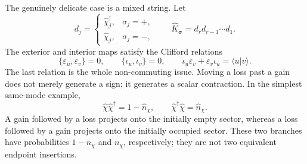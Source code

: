 \documentclass[aps,prb,onecolumn,nofootinbib,superscriptaddress]{revtex4-2}
\theoremstyle{plain}
\theoremstyle{definition}
\begin{document}
The genuinely delicate case is a mixed string.  Let
\begin{equation}
  d_j=
  \begin{cases}
    \hat\chi_j^\dagger, & \sigma_j=+,\\
    \hat\chi_j, & \sigma_j=-,
  \end{cases}
  \qquad
  \hat K_{\bm\sigma}=d_r d_{r-1}\cdots d_1 .
  \label{eq:mixed-odd-word}
\end{equation}
The exterior and interior maps satisfy the Clifford relations
\begin{equation}
  \{\varepsilon_u,\varepsilon_v\}=0,
  \qquad
  \{\iota_u,\iota_v\}=0,
  \qquad
  \iota_u\varepsilon_v+\varepsilon_v\iota_u=\langle u|v\rangle .
  \label{eq:exterior-interior-clifford-relations}
\end{equation}
The last relation is the whole non-commuting issue.  Moving a loss past a gain
does not merely generate a sign; it generates a scalar contraction.  In the
simplest same-mode example,
\begin{equation}
  \hat\chi\hat\chi^\dagger=1-\hat n_\chi,
  \qquad
  \hat\chi^\dagger\hat\chi=\hat n_\chi .
  \label{eq:same-mode-gain-loss-projectors}
\end{equation}
A gain followed by a loss projects onto the initially empty sector, whereas a
loss followed by a gain projects onto the initially occupied sector.  These
two branches have probabilities \(1-n_\chi\) and \(n_\chi\), respectively;
they are not two equivalent endpoint insertions.
\end{document}
